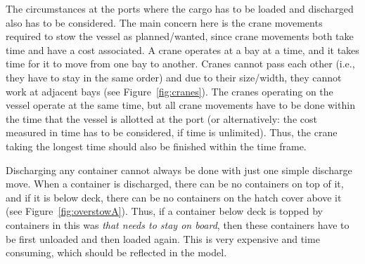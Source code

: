 %

The circumstances at the ports where the cargo has to be loaded and discharged also has to be considered. 
The main concern here is the crane movements required to stow the vessel as planned/wanted, since crane movements both take time and have a cost associated. 
A crane operates at a bay at a time, and it takes time for it to move from one bay to another. Cranes cannot pass each other (i.e., they have to stay in the same order) and due to their size/width, they cannot work at adjacent bays (see Figure~\ref{fig:cranes}). The cranes operating on the vessel operate at the same time, but all crane movements have to be done within the time that the vessel is allotted at the port (or alternatively: the cost measured in time has to be considered, if time is unlimited). Thus, the crane taking the longest time should also be finished within the time frame.

Discharging any container cannot always be done with just one simple discharge move. When a container is discharged, there can be no containers on top of it, and if it is below deck, there can be no containers on the hatch cover above it (see Figure~\ref{fig:overstowA}). Thus, if a container below deck is topped by containers in this was \emph{that needs to stay on board}, then these containers have to be first unloaded and then loaded again. This is very expensive and time consuming, which should be reflected in the model. 

